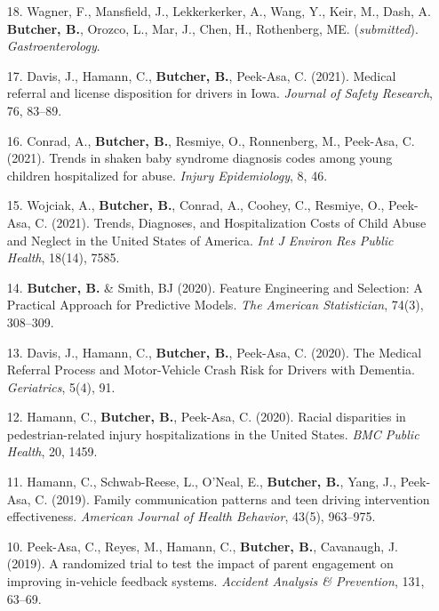 \documentclass[a4paper]{article}
\begin{document}
\begin{enumerate}

  \item[18.] Wagner, F., Mansfield, J., Lekkerkerker, A., Wang, Y., Keir, M., Dash, A.
    \textbf{Butcher, B.}, Orozco, L., Mar, J., Chen, H., Rothenberg, ME. (\textit{submitted}).
    \textit{Gastroenterology}.

  \item[17.] Davis, J., Hamann, C., \textbf{Butcher, B.}, Peek-Asa, C.
    (2021). Medical referral and license disposition for
    drivers in Iowa. \textit{Journal of Safety Research}, 76, 83--89.

  \item[16.] Conrad, A., \textbf{Butcher, B.}, Resmiye, O., Ronnenberg, M.,
    Peek-Asa, C. (2021). Trends in shaken baby syndrome diagnosis codes among
    young children hospitalized for abuse.
    \textit{Injury Epidemiology}, 8, 46.

  \item[15.] Wojciak, A., \textbf{Butcher, B.}, Conrad, A., Coohey, C.,
    Resmiye, O., Peek-Asa, C. (2021). Trends, Diagnoses, and Hospitalization Costs
    of Child Abuse and Neglect in the United States of America.
    \textit{Int J Environ Res Public Health}, 18(14), 7585.

  \item[14.] \textbf{Butcher, B.} \& Smith, BJ (2020). Feature Engineering and
    Selection: A Practical Approach for Predictive Models. \textit{The American Statistician},
    74(3), 308--309.

  \item[13.] Davis, J., Hamann, C., \textbf{Butcher, B.}, Peek-Asa, C. (2020). The
    Medical Referral Process and Motor-Vehicle Crash Risk for Drivers with Dementia.
    \textit{Geriatrics}, 5(4), 91.

  \item[12.] Hamann, C., \textbf{Butcher, B.}, Peek-Asa, C. (2020).
    Racial disparities in pedestrian-related injury hospitalizations in the
    United States. \textit{BMC Public Health}, 20, 1459.

  \item[11.] Hamann, C., Schwab-Reese, L., O'Neal, E., \textbf{Butcher, B.},
    Yang, J., Peek-Asa, C. (2019). Family communication
    patterns and teen driving intervention effectiveness.
    \textit{American Journal of Health Behavior}, 43(5), 963--975.

  \item[10.] Peek-Asa, C., Reyes, M., Hamann, C., \textbf{Butcher, B.},
    Cavanaugh, J. (2019). A randomized trial to test the impact
    of parent engagement on improving in-vehicle feedback systems.
    \textit{Accident Analysis \& Prevention}, 131, 63--69.


\end{enumerate}
\end{document}
